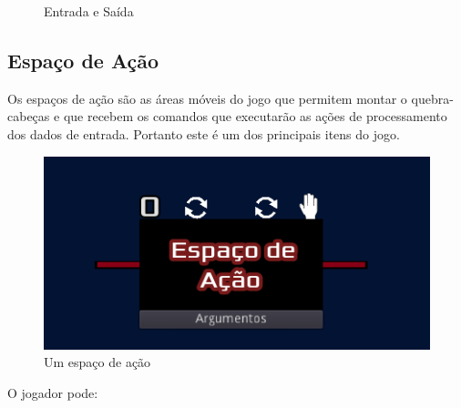 \begin{figure}[H]
\begin{minipage}{.4\textwidth}
    \end{minipage}
    \caption{Entrada e Saída}
\end{figure}

\subsection{Espaço de Ação}

Os espaços de ação são as áreas móveis do jogo que permitem montar o 
quebra-cabeças e que recebem os comandos que executarão as ações de 
processamento dos dados de entrada. Portanto este é um dos principais itens do 
jogo.

\begin{figure}[H]
    \includegraphics[width=\textwidth]{../figuras/espaco_acao.png}
    \caption{Um espaço de ação}
\end{figure}
\newpage
O jogador pode:
